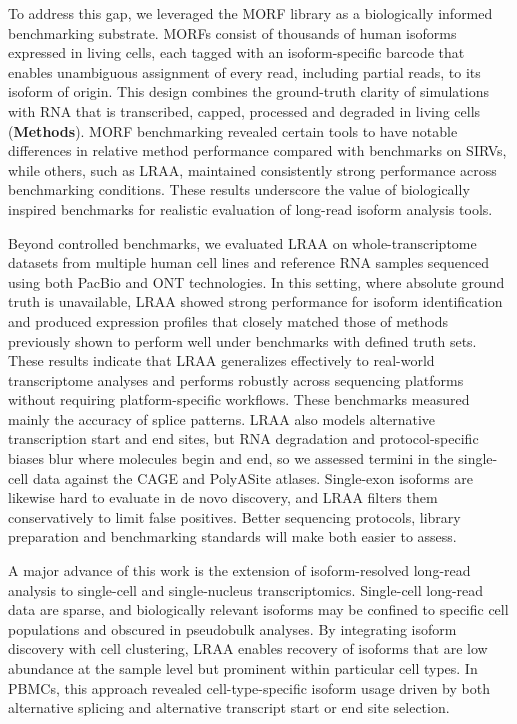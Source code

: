 To address this gap, we leveraged the MORF library as a biologically informed benchmarking substrate. MORFs consist of thousands of human isoforms expressed in living cells, each tagged with an isoform-specific barcode that enables unambiguous assignment of every read, including partial reads, to its isoform of origin. This design combines the ground-truth clarity of simulations with RNA that is transcribed, capped, processed and degraded in living cells (\textbf{Methods}). MORF benchmarking revealed certain tools to have notable differences in relative method performance compared with benchmarks on SIRVs, while others, such as LRAA, maintained consistently strong performance across benchmarking conditions. These results underscore the value of biologically inspired benchmarks for realistic evaluation of long-read isoform analysis tools.

Beyond controlled benchmarks, we evaluated LRAA on whole-transcriptome datasets from multiple human cell lines and reference RNA samples sequenced using both PacBio and ONT technologies. In this setting, where absolute ground truth is unavailable, LRAA showed strong performance for isoform identification and produced expression profiles that closely matched those of methods previously shown to perform well under benchmarks with defined truth sets. These results indicate that LRAA generalizes effectively to real-world transcriptome analyses and performs robustly across sequencing platforms without requiring platform-specific workflows. These benchmarks measured mainly the accuracy of splice patterns. LRAA also models alternative transcription start and end sites, but RNA degradation and protocol-specific biases blur where molecules begin and end, so we assessed termini in the single-cell data against the CAGE and PolyASite atlases. Single-exon isoforms are likewise hard to evaluate in de novo discovery, and LRAA filters them conservatively to limit false positives. Better sequencing protocols, library preparation and benchmarking standards will make both easier to assess.

A major advance of this work is the extension of isoform-resolved long-read analysis to single-cell and single-nucleus transcriptomics. Single-cell long-read data are sparse, and biologically relevant isoforms may be confined to specific cell populations and obscured in pseudobulk analyses. By integrating isoform discovery with cell clustering, LRAA enables recovery of isoforms that are low abundance at the sample level but prominent within particular cell types. In PBMCs, this approach revealed cell-type-specific isoform usage driven by both alternative splicing and alternative transcript start or end site selection.

